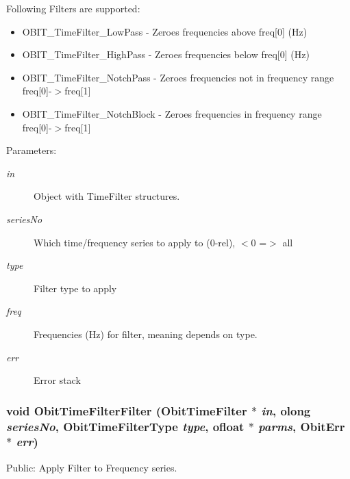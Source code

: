 Following Filters are supported: \begin{itemize}
\item OBIT\_\-Time\-Filter\_\-Low\-Pass - Zeroes frequencies above freq[0] (Hz) \item OBIT\_\-Time\-Filter\_\-High\-Pass - Zeroes frequencies below freq[0] (Hz) \item OBIT\_\-Time\-Filter\_\-Notch\-Pass - Zeroes frequencies not in frequency range freq[0]-$>$freq[1] \item OBIT\_\-Time\-Filter\_\-Notch\-Block - Zeroes frequencies in frequency range freq[0]-$>$freq[1]\end{itemize}
\begin{Desc}
\item[Parameters:]
\begin{description}
\item[{\em in}]Object with Time\-Filter structures. \item[{\em series\-No}]Which time/frequency series to apply to (0-rel), $<$0 =$>$ all \item[{\em type}]Filter type to apply \item[{\em freq}]Frequencies (Hz) for filter, meaning depends on type. \item[{\em err}]Error stack \end{description}
\end{Desc}
\subsubsection{\setlength{\rightskip}{0pt plus 5cm}void Obit\-Time\-Filter\-Filter ({\bf Obit\-Time\-Filter} $\ast$ {\em in}, {\bf olong} {\em series\-No}, Obit\-Time\-Filter\-Type {\em type}, {\bf ofloat} $\ast$ {\em parms}, {\bf Obit\-Err} $\ast$ {\em err})}\label{ObitTimeFilter_8h_a24}


Public: Apply Filter to Frequency series. 

